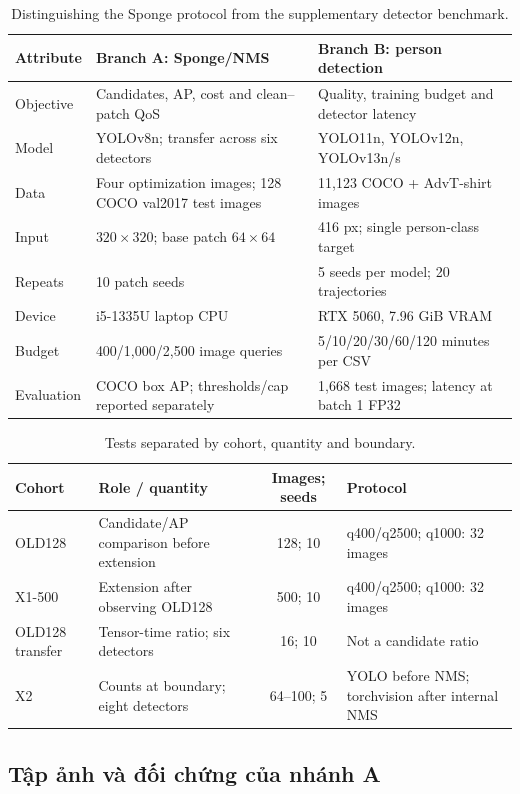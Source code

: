 \documentclass[a4paper,fleqn]{cas-dc}
\begin{document}
\begin{table}[t]
\centering
\small
\caption{Distinguishing the Sponge protocol from the supplementary detector benchmark.}
\begin{tabularx}{\textwidth}{@{}X X X @{}}
\toprule
\textbf{Attribute} & \textbf{Branch A: Sponge/NMS} & \textbf{Branch B: person detection} \\
\midrule
Objective & Candidates, AP, cost and clean--patch QoS & Quality, training budget and detector latency \\
Model & YOLOv8n; transfer across six detectors & YOLO11n, YOLOv12n, YOLOv13n/s \\
Data & Four optimization images; 128 COCO val2017 test images & 11,123 COCO + AdvT-shirt images \\
Input & $320\times320$; base patch $64\times64$ & 416 px; single person-class target \\
Repeats & 10 patch seeds & 5 seeds per model; 20 trajectories \\
Device & i5-1335U laptop CPU & RTX 5060, 7.96 GiB VRAM \\
Budget & 400/1,000/2,500 image queries & 5/10/20/30/60/120 minutes per CSV \\
Evaluation & COCO box AP; thresholds/cap reported separately & 1,668 test images; latency at batch 1 FP32 \\
\bottomrule
\end{tabularx}
\end{table}
\else
\begin{table}[t]\centering\small
\caption{Tests separated by cohort, quantity and boundary.}
\begin{tabularx}{\textwidth}{@{}l X c X@{}}\toprule
Cohort & Role / quantity & Images; seeds & Protocol \\
\midrule
OLD128 & Candidate/AP comparison before extension & 128; 10 & q400/q2500; q1000: 32 images \\
X1-500 & Extension after observing OLD128 & 500; 10 & q400/q2500; q1000: 32 images \\
OLD128 transfer & Tensor-time ratio; six detectors & 16; 10 & Not a candidate ratio \\
X2 & Counts at boundary; eight detectors & 64--100; 5 & YOLO before NMS; torchvision after internal NMS \\
\bottomrule\end{tabularx}\label{tab:cohorts}\end{table}
\fi

\subsection{Tập ảnh và đối chứng của nhánh A}
\end{document}
